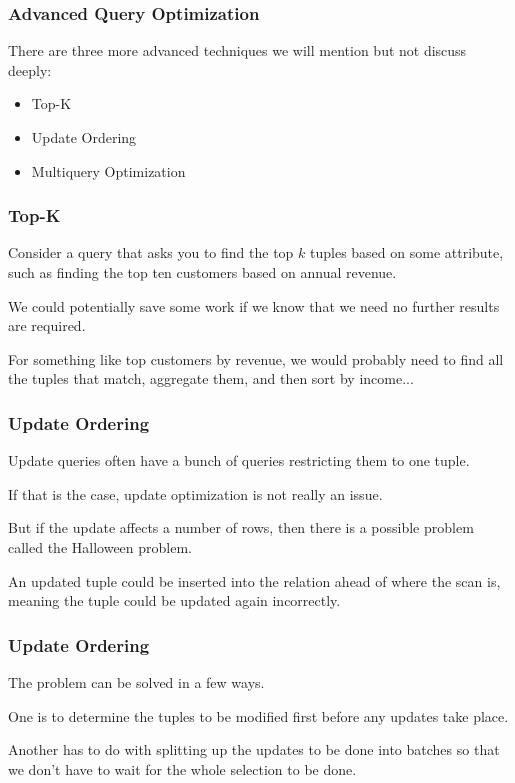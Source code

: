 \begin{frame}
\frametitle{Advanced Query Optimization}

There are three more advanced techniques we will mention but not discuss deeply:

\begin{itemize}
	\item Top-K
	\item Update Ordering
	\item Multiquery Optimization
\end{itemize}


\end{frame}

\begin{frame}
\frametitle{Top-K}

Consider a query that asks you to find the top $k$ tuples based on some attribute, such as finding the top ten customers based on annual revenue. 

We could potentially save some work if we know that we need no further results are required.

For something like top customers by revenue, we would probably need to find all the tuples that match, aggregate them, and then sort by income...

\end{frame}


\begin{frame}
\frametitle{Update Ordering}

Update queries often have a bunch of queries restricting them to one tuple. 

If that is the case, update optimization is not really an issue. 

But if the update affects a number of rows, then there is a possible problem called the \alert{Halloween problem}.

An updated tuple could be inserted into the relation ahead of where the scan is, meaning the tuple could be updated again incorrectly. 

\end{frame}

\begin{frame}
\frametitle{Update Ordering}

The problem can be solved in a few ways. 

One is to determine the tuples to be modified first before any updates take place. 

Another has to do with splitting up the updates to be done into batches so that we don't have to wait for the whole selection to be done.


\end{frame}


